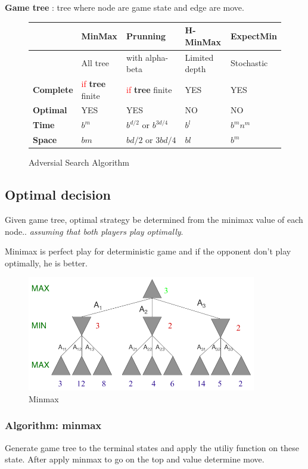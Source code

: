 \textbf{Game tree} : tree where node are game state and edge are move.

\begin{figure}[h]
\centering
\begin{tabular}{|l|m{3cm}|m{3cm}|m{3cm}|m{3cm}|}
\hline
& \textbf{MinMax} & \textbf{Prunning} & \textbf{H-MinMax} & \textbf{ExpectMin} \\
\hline
& All tree & with alpha-beta & Limited depth & Stochastic \\

\hline
\hline
\textbf{Complete} & \textcolor{red}{if} \textbf{tree} finite & \textcolor{red}{if} \textbf{tree} finite  & YES  & YES \\
\hline
\textbf{Optimal} & YES & YES & NO & NO \\
\hline
\textbf{Time} & $b^{m}$    & $b^{d/2}\textrm{ or }b^{3d/4}$ & $b^l$ & $b^m n^m$\\
\hline
\textbf{Space} & $bm$ & $bd/2\textrm{ or }3bd/4$ & $bl$ & $b^m$ \\
\hline

\end{tabular}
\caption{Adversial Search Algorithm}
\end{figure}



\subsection{Optimal decision}
Given game tree, optimal strategy be determined from the minimax value of each
node.. \textit{assuming that both players play optimally}.

Minimax is perfect play for deterministic game and if the opponent don't play
optimally, he is better.

\begin{figure}[h]
    \centering
    \includegraphics[width=10cm]{minmax.png}
    \caption{Minmax}
\end{figure}

\subsubsection{Algorithm: minmax}
Generate game tree to the terminal states and apply the utiliy function on these state.
After apply minmax to go on the top and value determine move.

